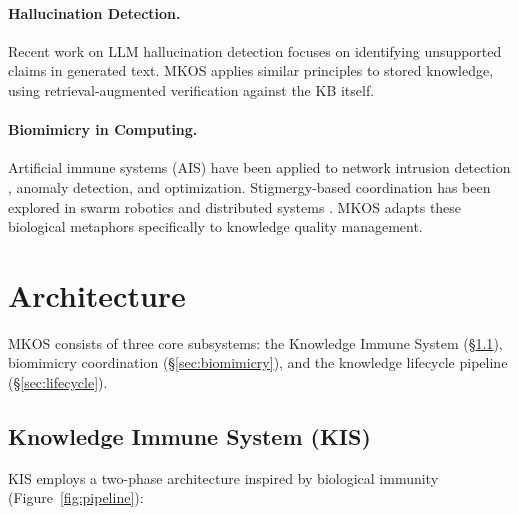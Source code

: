 \documentclass[11pt]{article}
\begin{document}
\paragraph{Hallucination Detection.} Recent work on LLM hallucination detection \citep{li2023halueval, manakul2023selfcheckgpt} focuses on identifying unsupported claims in generated text. MKOS applies similar principles to stored knowledge, using retrieval-augmented verification against the KB itself.

\paragraph{Biomimicry in Computing.} Artificial immune systems (AIS) have been applied to network intrusion detection \citep{dasgupta2011advances}, anomaly detection, and optimization. Stigmergy-based coordination has been explored in swarm robotics and distributed systems \citep{theraulaz1999brief}. MKOS adapts these biological metaphors specifically to knowledge quality management.

\section{Architecture}
\label{sec:arch}

MKOS consists of three core subsystems: the Knowledge Immune System (\S\ref{sec:kis}), biomimicry coordination (\S\ref{sec:biomimicry}), and the knowledge lifecycle pipeline (\S\ref{sec:lifecycle}).

\subsection{Knowledge Immune System (KIS)}
\label{sec:kis}

KIS employs a two-phase architecture inspired by biological immunity (Figure~\ref{fig:pipeline}):
\end{document}
